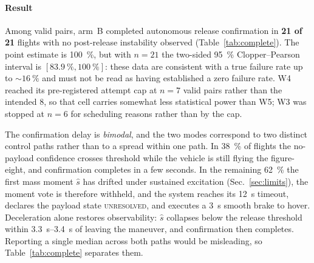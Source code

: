 \paragraph{Result} Among valid pairs, arm~B completed autonomous release confirmation in
\textbf{21 of 21} flights with no post-release instability observed
(Table~\ref{tab:complete}). The point estimate is \SI{100}{\percent}, but with $n=21$ the
two-sided \SI{95}{\percent} Clopper--Pearson interval is $[\SI{83.9}{\percent},
\SI{100}{\percent}]$: these data are consistent with a true failure rate up to
${\sim}\SI{16}{\percent}$ and must not be read as having established a zero failure rate.
W4 reached its pre-registered attempt cap at $n=7$ valid pairs rather than the intended 8,
so that cell carries somewhat less statistical power than W5; W3 was stopped at $n=6$ for
scheduling reasons rather than by the cap.

The confirmation delay is \emph{bimodal}, and the two modes correspond to two distinct
control paths rather than to a spread within one path. In \SI{38}{\percent} of flights the
no-payload confidence crosses threshold while the vehicle is still flying the figure-eight,
and confirmation completes in a few seconds. In the remaining \SI{62}{\percent} the first
mass moment $\hat s$ has drifted under sustained excitation (Sec.~\ref{sec:limits}),
the moment vote is therefore withheld, and the system reaches its \SI{12}{s} timeout,
declares the payload state \textsc{unresolved}, and executes a \SI{3}{s} smooth brake to
hover. Deceleration alone restores observability: $\hat s$ collapses below the release
threshold within \SIrange{3.3}{3.4}{s} of leaving the maneuver, and confirmation then
completes. Reporting a single median across both paths would be misleading, so
Table~\ref{tab:complete} separates them.

